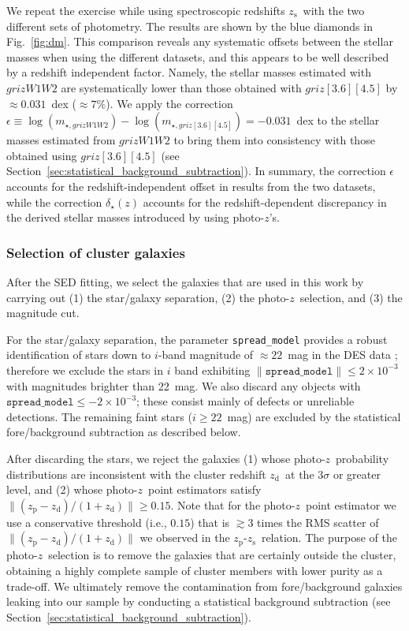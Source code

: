 \documentclass[useAMS,usenatbib,iop,numberedappendix]{mn2e}
\newcommand{\redshift}{\ensuremath{z}}
\newcommand{\zp}{\ensuremath{z_{\mathrm{p}}}}
\newcommand{\zd}{\ensuremath{z_{\mathrm{d}}}}
\newcommand{\zs}{\ensuremath{z_{\mathrm{s}}}}
\newcommand{\IRACone}{\ensuremath{[3.6]}}
\newcommand{\IRACtwo}{\ensuremath{[4.5]}}
\newcommand{\Wone}{\ensuremath{W1}}
\newcommand{\Wtwo}{\ensuremath{W2}}
\newcommand{\percent}{\ensuremath{\%}}
\begin{document}
We repeat the exercise while using spectroscopic redshifts \zs\ with the two different sets of photometry.
The results are shown by the blue diamonds in Fig.~\ref{fig:dm}.  This comparison reveals any systematic offsets between the stellar masses when using the different datasets, and this appears to be well described by a redshift independent factor.  Namely,  the stellar masses estimated with $griz\Wone\Wtwo$ are systematically lower than those obtained with $griz\IRACone\IRACtwo$ by $\approx0.031$~dex ($\approx7\percent$).  We apply the correction $\epsilon \equiv \log(m_{\star, griz\Wone\Wtwo}) - \log(m_{\star, griz\IRACone\IRACtwo}) = -0.031$~dex to the stellar masses estimated from  $griz\Wone\Wtwo$ to bring them into consistency with those obtained using $griz\IRACone\IRACtwo$ (see Section~\ref{sec:statistical_background_subtraction}).
In summary, the correction $\epsilon$ accounts for the redshift-independent offset in results from the two datasets, while the correction $\delta_{\star}(\redshift)$ accounts for the redshift-dependent discrepancy in the derived stellar masses introduced by using photo-\redshift's.




\subsubsection{Selection of cluster galaxies}
\label{sec:selection_of_cluster_galaxies}

After the SED fitting, we select the galaxies that are used in this work by carrying out (1) the star/galaxy separation, (2) the photo-\redshift\ selection, and (3) the magnitude cut.


For the star/galaxy separation, the parameter \texttt{spread\_model} provides a robust identification of stars down to $i$-band magnitude of $\approx22$~mag in the DES data \citep{hennig17}; therefore we exclude the stars in $i$ band exhibiting $\|\mathtt{spread\_model}\| \le 2\times10^{-3}$ with magnitudes brighter than 22~mag.  We also discard any objects with $\mathtt{spread\_model} \le -2\times10^{-3}$; these consist mainly of defects or unreliable detections.  The remaining faint stars ($i \geq 22$~mag) are excluded by the statistical fore/background subtraction as described below.

After discarding the stars, we reject the galaxies (1) whose photo-\redshift\ probability distributions are inconsistent with the cluster redshift \zd\ at the $3\sigma$ or greater level, and 
(2) whose photo-\redshift\ point estimators satisfy $\| \left( \zp - \zd \right) / \left( 1 + \zd \right) \| \geq 0.15$.  Note that for the photo-\redshift\ point estimator we use a conservative threshold  (i.e., $0.15$) that is $\gtrsim3$ times the RMS scatter of $\| \left( \zp - \zd \right) / \left( 1 + \zd \right) \|$
we observed in the \zp-\zs\ relation.  The purpose of the photo-\redshift\ selection is to remove the galaxies that are certainly outside the cluster, obtaining a highly complete sample of cluster members with lower purity as a trade-off.  We ultimately remove the contamination from fore/background galaxies leaking into our sample by conducting a statistical background subtraction (see Section~\ref{sec:statistical_background_subtraction}).
\end{document}
